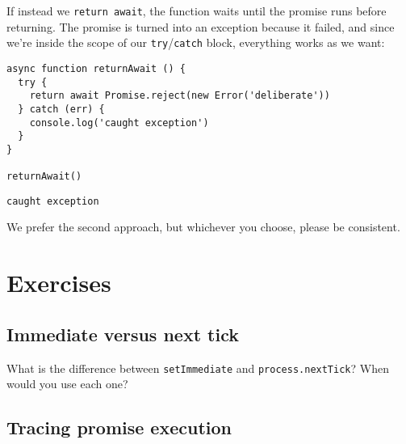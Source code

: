 \documentclass[krantzl]{krantz}
\begin{document}
If instead we \texttt{return await},
the function waits until the promise runs before returning.
The promise is turned into an exception because it failed,
and since we’re inside the scope of our \texttt{try}/\texttt{catch} block,
everything works as we want:


\begin{lstlisting}[frame=tblr]
async function returnAwait () {
  try {
    return await Promise.reject(new Error('deliberate'))
  } catch (err) {
    console.log('caught exception')
  }
}

returnAwait()
\end{lstlisting}



\begin{lstlisting}[frame=tblr,backgroundcolor=\color{black!5}]
caught exception
\end{lstlisting}



\noindent We prefer the second approach,
but whichever you choose,
please be consistent.

\section{Exercises}\label{async-programming-exercises}

\subsection*{Immediate versus next tick}


What is the difference between \texttt{setImmediate} and \texttt{process.nextTick}?
When would you use each one?

\subsection*{Tracing promise execution}
\end{document}
